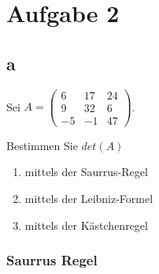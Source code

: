 \section{Aufgabe 2}

\subsection{a}
Sei $A = \begin{pmatrix}6 & 17 & 24 \\ 9 & 32 & 6 \\ -5 & -1 & 47\end{pmatrix}$.

Bestimmen Sie $det(A)$

\begin{enumerate}
    \item mittels der Saurrus-Regel
    \item mittels der Leibniz-Formel
    \item mittels der Kästchenregel
\end{enumerate}

\subsubsection*{Saurrus Regel}

